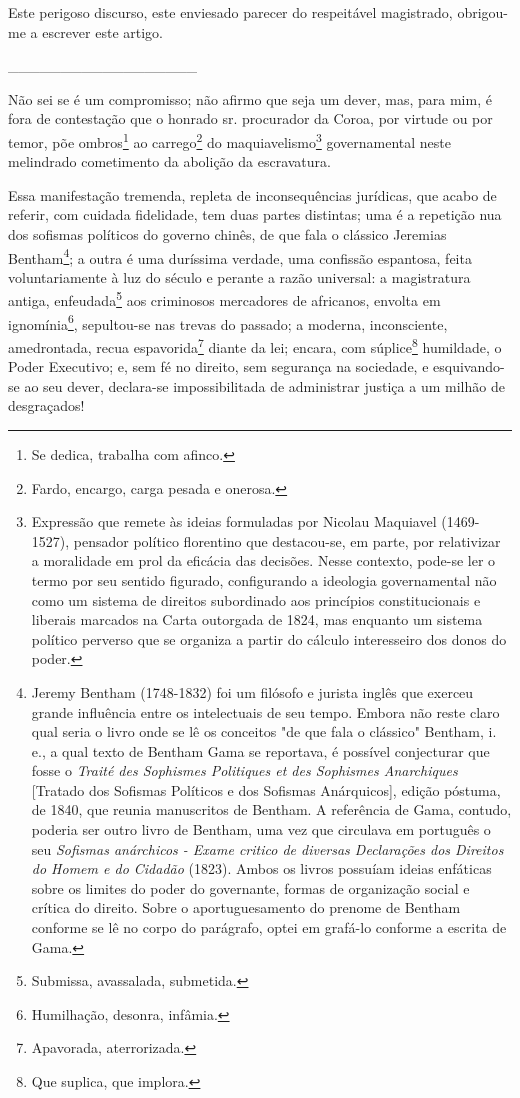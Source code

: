 Este perigoso discurso, este enviesado parecer do respeitável
magistrado, obrigou-me a escrever este artigo.

\_\_\_\_\_\_\_\_\_\_\_\_\_\_\_\_\_\_

Não sei se é um compromisso; não afirmo que seja um dever, mas, para
mim, é fora de contestação que o honrado sr. procurador da Coroa, por
virtude ou por temor, põe ombros\footnote{Se dedica, trabalha com
  afinco.} ao carrego\footnote{Fardo, encargo, carga pesada e onerosa.}
do maquiavelismo\footnote{Expressão que remete às ideias formuladas
  por Nicolau Maquiavel (1469-1527), pensador político florentino que
  destacou-se, em parte, por relativizar a moralidade em prol da
  eficácia das decisões. Nesse contexto, pode-se ler o termo por seu
  sentido figurado, configurando a ideologia governamental não como um
  sistema de direitos subordinado aos princípios constitucionais e
  liberais marcados na Carta outorgada de 1824, mas enquanto um sistema
  político perverso que se organiza a partir do cálculo interesseiro dos
  donos do poder.} governamental neste melindrado cometimento da
abolição da escravatura.

Essa manifestação tremenda, repleta de inconsequências jurídicas, que
acabo de referir, com cuidada fidelidade, tem duas partes distintas; uma
é a repetição nua dos sofismas políticos do governo chinês, de que fala
o clássico Jeremias Bentham\footnote{Jeremy Bentham (1748-1832) foi um
  filósofo e jurista inglês que exerceu grande influência entre os
  intelectuais de seu tempo. Embora não reste claro qual seria o livro
  onde se lê os conceitos "de que fala o clássico" Bentham, i. e., a
  qual texto de Bentham Gama se reportava, é possível conjecturar que
  fosse o \emph{Traité des Sophismes Politiques et des Sophismes
  Anarchiques} {[}Tratado dos Sofismas Políticos e dos Sofismas
  Anárquicos{]}, edição póstuma, de 1840, que reunia manuscritos de
  Bentham. A referência de Gama, contudo, poderia ser outro livro de
  Bentham, uma vez que circulava em português o seu \emph{Sofismas
  anárchicos - Exame critico de diversas Declarações dos Direitos do
  Homem e do Cidadão} (1823). Ambos os livros possuíam ideias enfáticas
  sobre os limites do poder do governante, formas de organização social
  e crítica do direito. Sobre o aportuguesamento do prenome de Bentham
  conforme se lê no corpo do parágrafo, optei em grafá-lo conforme a
  escrita de Gama.}; a outra é uma duríssima verdade, uma confissão
espantosa, feita voluntariamente à luz do século e perante a razão
universal: a magistratura antiga, enfeudada\footnote{Submissa,
  avassalada, submetida.} aos criminosos mercadores de africanos,
envolta em ignomínia\footnote{Humilhação, desonra, infâmia.},
sepultou-se nas trevas do passado; a moderna, inconsciente, amedrontada,
recua espavorida\footnote{Apavorada, aterrorizada.} diante da lei;
encara, com súplice\footnote{Que suplica, que implora.} humildade, o
Poder Executivo; e, sem fé no direito, sem segurança na sociedade, e
esquivando-se ao seu dever, declara-se impossibilitada de administrar
justiça a um milhão de desgraçados!

